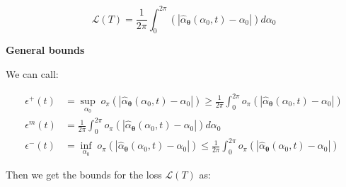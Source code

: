 \documentclass{article} %
\newcounter{ct}
\theoremstyle{definition}
\theoremstyle{remark}
\begin{document}
\begin{equation}
    \mathcal{L}(T) =  \frac{1}{2 \pi} \int_0^{2 \pi}    \left( \left| \hat{\alpha}_{\boldsymbol{\theta}}(\alpha_0, t) - \alpha_0  \right| \right)  d\alpha_0
\end{equation}


%







\textbf{General bounds}

We can call:

\begin{equation}
\begin{split}
    \epsilon^+(t) &= \sup_{\alpha_0} \; o_\pi \left( \left| \hat{\alpha}_{\boldsymbol{\theta}}(\alpha_0, t) - \alpha_0  \right| \right) \geq \frac{1}{2 \pi} \int_0^{2 \pi}  o_\pi \left( \left| \hat{\alpha}_{\boldsymbol{\theta}}(\alpha_0, t) - \alpha_0  \right| \right)  \\
     \epsilon^{m}(t) &= \frac{1}{2 \pi} \int_0^{2 \pi}  o_\pi \left( \left| \hat{\alpha}_{\boldsymbol{\theta}}(\alpha_0, t) - \alpha_0  \right| \right) d\alpha_0 \\
    \epsilon^-(t) &= \inf_{\alpha_0} \; o_\pi \left( \left| \hat{\alpha}_{\boldsymbol{\theta}}(\alpha_0, t) - \alpha_0  \right| \right) \leq \frac{1}{2 \pi} \int_0^{2 \pi}  o_\pi \left( \left| \hat{\alpha}_{\boldsymbol{\theta}}(\alpha_0, t) - \alpha_0  \right| \right)
\end{split}
\end{equation}

Then we get the bounds for the loss \(\mathcal{L}(T)\) as:
\end{document}
